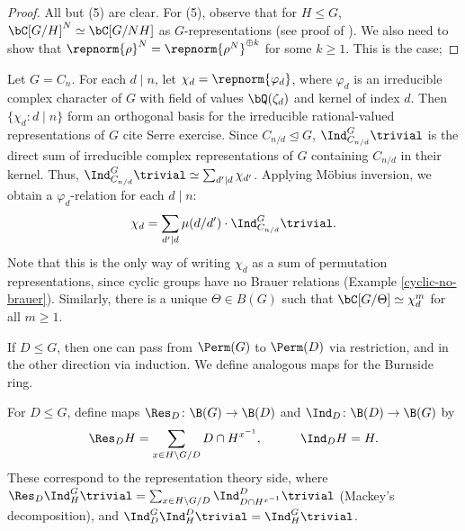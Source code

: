 \begin{proof}
    All but (5) are clear. For (5), observe that for $H \leq G$, $\bC[G / H]^N \simeq \bC[G / NH]$ as $G$-representations (see proof of \cite[Theorem 2.8]{reg-const}). We also need to show that $\repnorm{\rho}^N = \repnorm{\rho^N}^{\oplus k}$ for some $k \geq 1$. This is the case; 
\end{proof}


\begin{example}\label{cyclic-relns}
    Let $G = C_n$. For each $d \mid n$, let $\chi_d = \repnorm{\varphi_d}$, where $\varphi_d$ is an irreducible complex character of $G$ with field of values $\bQ(\zeta_d)$ and kernel of index $d$.
    Then $\{ \chi_d \colon d\mid n \}$ form an orthogonal basis for the irreducible rational-valued representations of $G$ {\color{red} cite Serre exercise}. Since $C_{n / d} \trianglelefteq G$, $\Ind_{C_{n/ d}}^G \trivial$ is the direct sum of irreducible complex representations of $G$ containing $C_{n / d}$ in their kernel. Thus, $\Ind_{C_{n/ d}}^G \trivial \simeq \sum_{d' \mid d} \chi_{d'}$. Applying M\"{o}bius inversion, we obtain a $\varphi_d$-relation for each $d \mid n$:
    \[ \chi_d = \sum_{d' \mid d} \mu(d / d') \cdot \Ind_{C_{n/ d}}^G \trivial. \]
    Note that this is the only way of writing $\chi_d$ as a sum of permutation representations, since cyclic groups have no Brauer relations (Example \ref{cyclic-no-brauer}). Similarly, there is a unique $\Theta \in B(G)$ such that $\bC[G / \Theta] \simeq \chi_d^{m}$ for all $m \geq 1$.
    \end{example}

If $D \leq G$, then one can pass from $\Perm(G)$ to $\Perm(D)$ via restriction, and in the other direction via induction. We define analogous maps for the Burnside ring.    

\begin{defn}
    For $D \leq G$, define maps $\Res_D \colon \B(G) \to \B(D)$ and $\Ind_D \colon \B(D) \to \B(G)$ by
    \[  \Res_D H = \sum_{x \in H \backslash G / D} D \cap H^{x^{-1}}, \qquad \quad \Ind_D H = H. \]
    These correspond to the representation theory side, where $\Res_D \Ind_{H}^G \trivial = \sum_{x \in H \backslash G / D} \Ind_{D \cap H^{x^{-1}}}^D \trivial$ (Mackey's decomposition), and $\Ind_{D}^G\Ind_{H}^D \trivial = \Ind_{H}^G \trivial$.
\end{defn}
